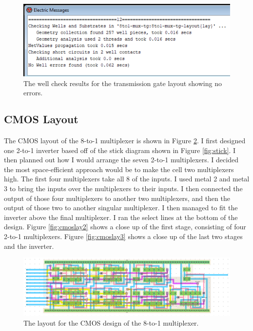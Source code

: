 \documentclass{article}
\begin{document}
    \begin{figure}[H]
      \centering
      \includegraphics[width=0.6\linewidth, frame]{screenshots/tg/lay/well.png}
      \caption{The well check results for the transmission gate layout showing no errors.}
      \label{fig:tglaywell}
    \end{figure}



  \subsection{CMOS Layout}
    \paragraph{}
    The CMOS layout of the 8-to-1 multiplexer is shown in Figure \ref{fig:cmoslay1}. I first designed one 2-to-1 inverter based off of the stick diagram shown in Figure \ref{fig:stick}. I then planned out how I would arrange the seven 2-to-1 multiplexers. I decided the most space-efficient approach would be to make the cell two multiplexers high. The first four multiplexers take all 8 of the inputs. I used metal 2 and metal 3 to bring the inputs over the multiplexers to their inputs. I then connected the output of those four multiplexers to another two multiplexers, and then the output of those two to another singular multiplexer. I then managed to fit the inverter above the final multiplexer. I ran the select lines at the bottom of the design. Figure \ref{fig:cmoslay2} shows a close up of the first stage, consisting of four 2-to-1 multiplexers. Figure \ref{fig:cmoslay3} shows a close up of the last two stages and the inverter.

    \begin{figure}[H]
      \centering
      \includegraphics[width=\linewidth, frame]{screenshots/cmos/lay/lay1.png}
      \caption{The layout for the CMOS design of the 8-to-1 multiplexer.}
      \label{fig:cmoslay1}
    \end{figure}
\end{document}
